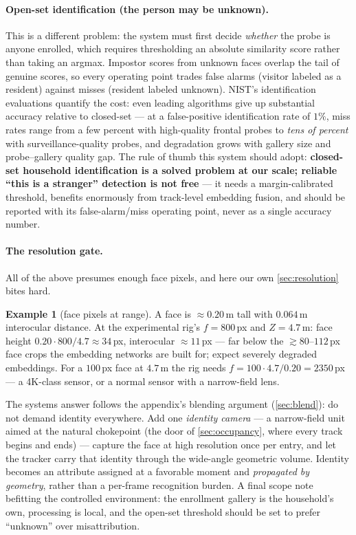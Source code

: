 \documentclass[11pt]{article}
\theoremstyle{definition}
\newtheorem{example}{Example}
\begin{document}
\paragraph{Open-set identification (the person may be unknown).} This is
a different problem: the system must first decide \emph{whether} the
probe is anyone enrolled, which requires thresholding an absolute
similarity score rather than taking an argmax. Impostor scores from
unknown faces overlap the tail of genuine scores, so every operating
point trades false alarms (visitor labeled as a resident) against misses
(resident labeled unknown). NIST's identification evaluations
\cite{Grother2019} quantify the cost: even leading algorithms give up
substantial accuracy relative to closed-set --- at a false-positive
identification rate of $1\%$, miss rates range from a few percent with
high-quality frontal probes to \emph{tens of percent} with
surveillance-quality probes, and degradation grows with gallery size and
probe--gallery quality gap. The rule of thumb this system should adopt:
\textbf{closed-set household identification is a solved problem at our
scale; reliable ``this is a stranger'' detection is not free} --- it
needs a margin-calibrated threshold, benefits enormously from track-level
embedding fusion, and should be reported with its false-alarm/miss
operating point, never as a single accuracy number.

\paragraph{The resolution gate.} All of the above presumes enough face
pixels, and here our own \autoref{sec:resolution} bites hard.

\begin{example}[face pixels at range]
\label{ex:facepixels}
A face is $\approx0.20$\,m tall with $0.064$\,m interocular distance. At
the experimental rig's $f=800$\,px and $Z=4.7$\,m: face height
$0.20\cdot800/4.7\approx34$\,px, interocular
$\approx11$\,px --- far below the $\gtrsim80$--$112$\,px face crops the
embedding networks are built for; expect severely degraded embeddings.
For a $100$\,px face at $4.7$\,m the rig needs
$f=100\cdot4.7/0.20=2350$\,px --- a 4K-class sensor, or a normal sensor
with a narrow-field lens.
\end{example}

The systems answer follows the appendix's blending argument
(\autoref{sec:blend}): do not demand identity everywhere. Add one
\emph{identity camera} --- a narrow-field unit aimed at the natural
chokepoint (the door of \autoref{sec:occupancy}, where every track
begins and ends) --- capture the face at high resolution once per entry,
and let the tracker carry that identity through the wide-angle geometric
volume. Identity becomes an attribute assigned at a favorable moment and
\emph{propagated by geometry}, rather than a per-frame recognition
burden. A final scope note befitting the controlled environment: the
enrollment gallery is the household's own, processing is local, and the
open-set threshold should be set to prefer ``unknown'' over
misattribution.
\end{document}
